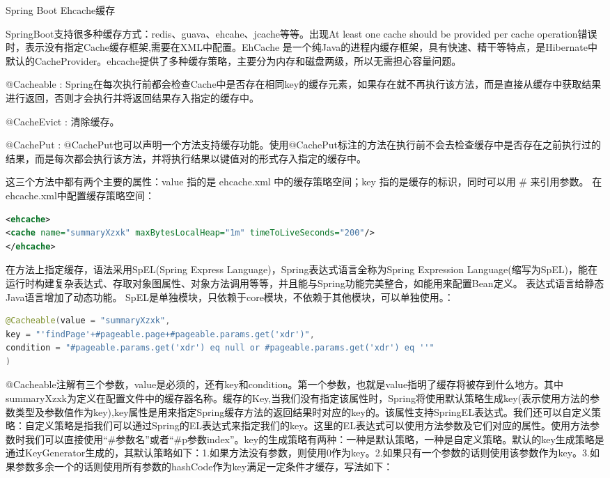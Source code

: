 \documentclass[12pt]{book}
\makeatletter
\numberwithin{dummy}{section}
\theoremstyle{ocrenumbox}
\theoremstyle{blacknumex}
\theoremstyle{blacknumbox}
\theoremstyle{ocrenum}
\renewcommand{\subsection}{\@startsection {subsection}{2}{\z@}
	{-3ex \@plus -0.1ex \@minus -.4ex}
	{0.5ex \@plus.2ex }
	{\normalfont\sffamily\bfseries}}
\makeatother
\begin{document}
\subsection{Spring Boot Ehcache缓存}

SpringBoot支持很多种缓存方式：redis、guava、ehcahe、jcache等等。出现At least one cache should be provided per cache operation错误时，表示没有指定Cache缓存框架,需要在XML中配置。EhCache 是一个纯Java的进程内缓存框架，具有快速、精干等特点，是Hibernate中默认的CacheProvider。ehcache提供了多种缓存策略，主要分为内存和磁盘两级，所以无需担心容量问题。

@Cacheable : Spring在每次执行前都会检查Cache中是否存在相同key的缓存元素，如果存在就不再执行该方法，而是直接从缓存中获取结果进行返回，否则才会执行并将返回结果存入指定的缓存中。 

@CacheEvict : 清除缓存。 

@CachePut : @CachePut也可以声明一个方法支持缓存功能。使用@CachePut标注的方法在执行前不会去检查缓存中是否存在之前执行过的结果，而是每次都会执行该方法，并将执行结果以键值对的形式存入指定的缓存中。 

这三个方法中都有两个主要的属性：value 指的是 ehcache.xml 中的缓存策略空间；key 指的是缓存的标识，同时可以用 \# 来引用参数。
在ehcache.xml中配置缓存策略空间：

\begin{lstlisting}[language=XML]
<ehcache>
<cache name="summaryXzxk" maxBytesLocalHeap="1m" timeToLiveSeconds="200"/>
</ehcache>
\end{lstlisting}

在方法上指定缓存，语法采用SpEL(Spring Express Language)，Spring表达式语言全称为Spring Expression Language(缩写为SpEL)，能在运行时构建复杂表达式、存取对象图属性、对象方法调用等等，并且能与Spring功能完美整合，如能用来配置Bean定义。 表达式语言给静态Java语言增加了动态功能。
SpEL是单独模块，只依赖于core模块，不依赖于其他模块，可以单独使用。：

\begin{lstlisting}[language=Java]
@Cacheable(value = "summaryXzxk",
key = "'findPage'+#pageable.page+#pageable.params.get('xdr')",
condition = "#pageable.params.get('xdr') eq null or #pageable.params.get('xdr') eq ''"
)
\end{lstlisting}

@Cacheable注解有三个参数，value是必须的，还有key和condition。第一个参数，也就是value指明了缓存将被存到什么地方。其中summaryXzxk为定义在配置文件中的缓存器名称。缓存的Key,当我们没有指定该属性时，Spring将使用默认策略生成key(表示使用方法的参数类型及参数值作为key),key属性是用来指定Spring缓存方法的返回结果时对应的key的。该属性支持SpringEL表达式。我们还可以自定义策略：自定义策略是指我们可以通过Spring的EL表达式来指定我们的key。这里的EL表达式可以使用方法参数及它们对应的属性。使用方法参数时我们可以直接使用“\#参数名”或者“\#p参数index”。key的生成策略有两种：一种是默认策略，一种是自定义策略。默认的key生成策略是通过KeyGenerator生成的，其默认策略如下：1.如果方法没有参数，则使用0作为key。2.如果只有一个参数的话则使用该参数作为key。3.如果参数多余一个的话则使用所有参数的hashCode作为key满足一定条件才缓存，写法如下：
\end{document}
